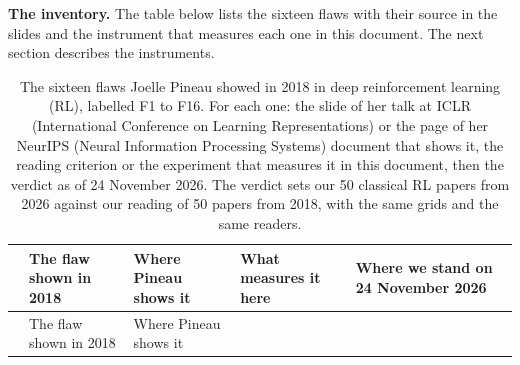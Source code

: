 \documentclass[11pt,a4paper]{article}
\begin{document}
\textbf{The inventory.} The table below lists the sixteen flaws with
their source in the slides and the instrument that measures each one in
this document. The next section describes the instruments.

\begin{longtable}[]{@{}
  >{\raggedright\arraybackslash}p{}
  >{\raggedright\arraybackslash}p{}
  >{\raggedright\arraybackslash}p{}
  >{\raggedright\arraybackslash}p{}
  >{\raggedright\arraybackslash}p{}@{}}
\caption{The sixteen flaws Joelle Pineau showed in 2018 in deep
reinforcement learning (RL), labelled F1 to F16. For each one: the slide
of her talk at ICLR (International Conference on Learning
Representations) or the page of her NeurIPS (Neural Information
Processing Systems) document that shows it, the reading criterion or the
experiment that measures it in this document, then the verdict as of 24
November 2026. The verdict sets our 50 classical RL papers from 2026
against our reading of 50 papers from 2018, with the same grids and the
same readers.}\tabularnewline
\toprule\noalign{}
\begin{minipage}[b]{\linewidth}\raggedright
\end{minipage} & \begin{minipage}[b]{\linewidth}\raggedright
The flaw shown in 2018
\end{minipage} & \begin{minipage}[b]{\linewidth}\raggedright
Where Pineau shows it
\end{minipage} & \begin{minipage}[b]{\linewidth}\raggedright
What measures it here
\end{minipage} & \begin{minipage}[b]{\linewidth}\raggedright
Where we stand on 24 November 2026
\end{minipage} \\
\midrule\noalign{}
\endfirsthead
\toprule\noalign{}
\begin{minipage}[b]{\linewidth}\raggedright
\end{minipage} & \begin{minipage}[b]{\linewidth}\raggedright
The flaw shown in 2018
\end{minipage} & \begin{minipage}[b]{\linewidth}\raggedright
Where Pineau shows it

\end{minipage}
\end{longtable}
\end{document}
